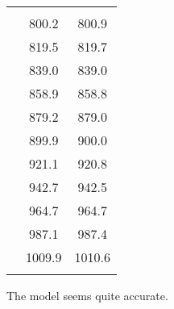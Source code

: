 \begin{problem}
\begin{subproblem}
\begin{shortsolution}
		\begin{tabular}{S[table-format=4.0]S[table-format=4.1]S[table-format=4.1]}
			\beforeheading
			 &  &  \\
			           & 800.2            & 800.9           \\           & 819.5            & 819.7           \\           & 839.0            & 839.0           \\           & 858.9            & 858.8           \\           & 879.2            & 879.0           \\           & 899.9            & 900.0           \\           & 921.1            & 920.8           \\           & 942.7            & 942.5           \\           & 964.7            & 964.7           \\           & 987.1            & 987.4           \\           & 1009.9           & 1010.6          \\\lastline
		\end{tabular}
																			
		The model seems quite accurate.
	\end{shortsolution}
\end{subproblem}
\end{problem}
			
